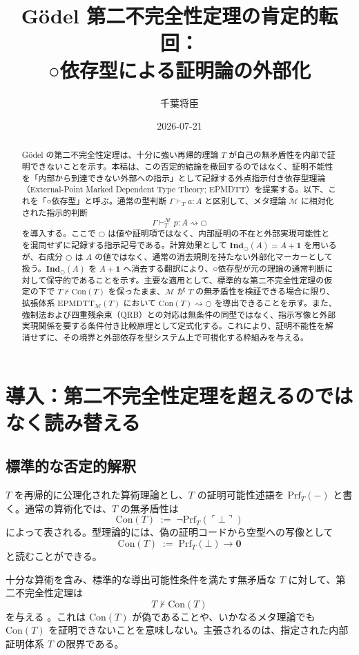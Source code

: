 \documentclass[a4paper,11pt]{ltjsarticle}
\title{Gödel 第二不完全性定理の肯定的転回：\\
○依存型による証明論の外部化}
\author{千葉将臣}
\date{2026-07-21}
\theoremstyle{definition}
\theoremstyle{plain}
\newcommand{\dfix}{\bigcirc}
\newcommand{\EPMDTT}{\mathrm{EPMDTT}}
\newcommand{\Prf}{\mathrm{Prf}}
\newcommand{\Con}{\mathrm{Con}}
\newcommand{\Ind}{\mathbf{Ind}_{\dfix}}
\newcommand{\Meta}{\mathcal{M}}
\newcommand{\False}{\mathbf{0}}
\newcommand{\Unit}{\mathbf{1}}
\begin{document}
\maketitle

\begin{abstract}
Gödel の第二不完全性定理は、十分に強い再帰的理論 $T$ が自己の無矛盾性を内部で証明できないことを示す。本稿は、この否定的結論を撤回するのではなく、証明不能性を「内部から到達できない外部への指示」として記録する外点指示付き依存型理論（External-Point Marked Dependent Type Theory; EPMDTT）を提案する。以下、これを「○依存型」と呼ぶ。通常の型判断 $\Gamma\vdash_T a:A$ と区別して、メタ理論 $\Meta$ に相対化された指示的判断
\[
 \Gamma\vdash^{\Meta}_T p:A\rightsquigarrow\dfix
\]
を導入する。ここで $\dfix$ は値や証明項ではなく、内部証明の不在と外部実現可能性とを混同せずに記録する指示記号である。計算効果として $\Ind(A)=A+\Unit$ を用いるが、右成分 $\dfix$ は $A$ の値ではなく、通常の消去規則を持たない外部化マーカーとして扱う。$\Ind(A)$ を $A+\Unit$ へ消去する翻訳により、○依存型が元の理論の通常判断に対して保守的であることを示す。主要な適用として、標準的な第二不完全性定理の仮定の下で $T\nvdash\Con(T)$ を保ったまま、$\Meta$ が $T$ の無矛盾性を検証できる場合に限り、拡張体系 $\EPMDTT_{\Meta}(T)$ において $\Con(T)\rightsquigarrow\dfix$ を導出できることを示す。また、強制法および四重残余束（QRB）との対応は無条件の同型ではなく、指示写像と外部実現関係を要する条件付き比較原理として定式化する。これにより、証明不能性を解消せずに、その境界と外部依存を型システム上で可視化する枠組みを与える。
\end{abstract}

\section{導入：第二不完全性定理を超えるのではなく読み替える}

\subsection{標準的な否定的解釈}

$T$ を再帰的に公理化された算術理論とし、$T$ の証明可能性述語を $\Prf_T(-)$ と書く。通常の算術化では、$T$ の無矛盾性は
\[
 \Con(T)\;:=\;\neg\Prf_T(\ulcorner\bot\urcorner)
\]
によって表される。型理論的には、偽の証明コードから空型への写像として
\[
 \Con(T)\;:=\;\Prf_T(\bot)\to\False
\]
と読むことができる。

十分な算術を含み、標準的な導出可能性条件を満たす無矛盾な $T$ に対して、第二不完全性定理は
\[
 T\nvdash\Con(T)
\]
を与える \cite{godel}。これは $\Con(T)$ が偽であることや、いかなるメタ理論でも $\Con(T)$ を証明できないことを意味しない。主張されるのは、指定された内部証明体系 $T$ の限界である。
\end{document}
